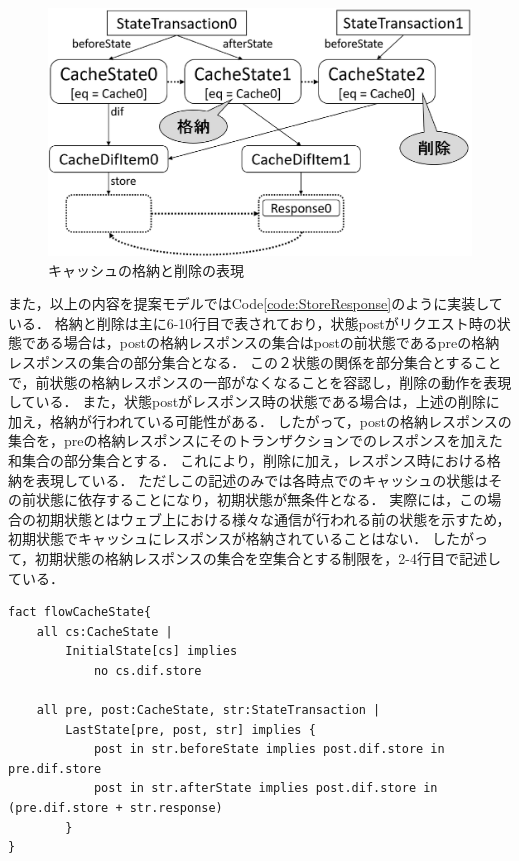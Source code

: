 \documentclass[12pt,a4paper]{jbook}
\begin{document}
\begin{figure}[htb]
\centering
\includegraphics[width=450pt]{./fig/ProposedModel-ResponseStoreDelete.eps}
\caption{キャッシュの格納と削除の表現}
\label{fig:ProposedModel-ResponseStoreDelete}
\end{figure}

また，以上の内容を提案モデルではCode\ref{code:StoreResponse}のように実装している．
格納と削除は主に6-10行目で表されており，状態postがリクエスト時の状態である場合は，postの格納レスポンスの集合はpostの前状態であるpreの格納レスポンスの集合の部分集合となる．
この２状態の関係を部分集合とすることで，前状態の格納レスポンスの一部がなくなることを容認し，削除の動作を表現している．
また，状態postがレスポンス時の状態である場合は，上述の削除に加え，格納が行われている可能性がある．
したがって，postの格納レスポンスの集合を，preの格納レスポンスにそのトランザクションでのレスポンスを加えた和集合の部分集合とする．
これにより，削除に加え，レスポンス時における格納を表現している．
ただしこの記述のみでは各時点でのキャッシュの状態はその前状態に依存することになり，初期状態が無条件となる．
実際には，この場合の初期状態とはウェブ上における様々な通信が行われる前の状態を示すため，初期状態でキャッシュにレスポンスが格納されていることはない．
したがって，初期状態の格納レスポンスの集合を空集合とする制限を，2-4行目で記述している．

\begin{lstlisting}[caption=レスポンスの格納と削除の表現, label=code:StoreResponse]
fact flowCacheState{
	all cs:CacheState |
		InitialState[cs] implies
			no cs.dif.store

	all pre, post:CacheState, str:StateTransaction |
		LastState[pre, post, str] implies {
			post in str.beforeState implies post.dif.store in pre.dif.store
			post in str.afterState implies post.dif.store in (pre.dif.store + str.response)
		}
}
\end{lstlisting}
\end{document}
